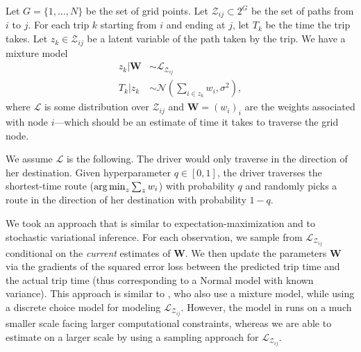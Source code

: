 \documentclass[11pt]{article}
\begin{document}
Let $G = \{1,\ldots,N\}$ be the set of grid points. Let $\mathcal{Z}_{ij} \subset 2^G$ be the set of paths from $i$ to $j$.
For each trip $k$ starting from $i$ and ending at $j$, let $T_k$ be the time the trip takes. Let $z_k \in \mathcal{Z}_{ij}$ be a latent variable of the path taken by the trip. We have a mixture model 
\begin{align*}
z_k | \bm W &\sim \mathcal{L}_{\mathcal{Z}_{ij}}\\
T_k | z_k &\sim \mathcal{N}\left(\sum_{i\in z_k} w_i, \sigma^2\right),
\end{align*}
where $\mathcal{L}$ is some distribution over $\mathcal{Z}_{ij}$ and $\bm W = (w_i)_i$ are the weights associated with node $i$---which should be an estimate of time it takes to traverse the grid node.

We assume $\mathcal{L}$ is the following. The driver would only traverse in the direction of her destination. Given hyperparameter $q \in [0,1]$, the driver traverses the shortest-time route ($\operatorname*{arg\,min}_{z} \sum_{z} w_i$) with probability $q$ and randomly picks a route in the direction of her destination with probability $1-q$.

We took an approach that is similar to expectation-maximization and to stochastic variational inference. For each observation, we sample from $\mathcal L_{\mathcal Z_{ij}}$ conditional on the \emph{current} estimates of $\bm W$. We then update the parameters $\bm W$ via the gradients of the squared error loss between the predicted trip time and the actual trip time (thus corresponding to a Normal model with known variance). This approach is similar to \cite{zhan2013urban}, who also use a mixture model, while using a discrete choice model for modeling $\mathcal L_{\mathcal Z_{ij}}$. However, the model in \cite{zhan2013urban} runs on a much smaller scale facing larger computational constraints, whereas we are able to estimate on a larger scale by using a sampling approach for $\mathcal L_{\mathcal Z_{ij}}$. 
\end{document}
